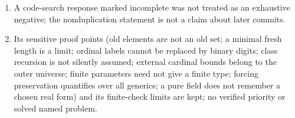\documentclass[11pt,letterpaper]{article}
\numberwithin{equation}{section}
\theoremstyle{definition}
\theoremstyle{remark}
\begin{document}
\begin{enumerate}[label=04.\arabic*,leftmargin=3.2em]
Bertram questions are not resolved. Its novelty claim: proposed original
results, with priority remaining to be independently established.
\item A code-search response marked incomplete was not treated as an exhaustive
negative; the nonduplication statement is not a claim about later commits.
\item Its sensitive proof points (old elements are not an old set; a minimal
fresh length is a limit; ordinal labels cannot be replaced by binary digits;
class recursion is not silently assumed; external cardinal bounds belong to the
outer universe; finite parameters need not give a finite type; forcing
preservation quantifies over all generics; a pure field does not remember a
chosen real form) and its finite-check limits are kept; no verified priority or
solved named problem.
\end{enumerate}
\end{document}
